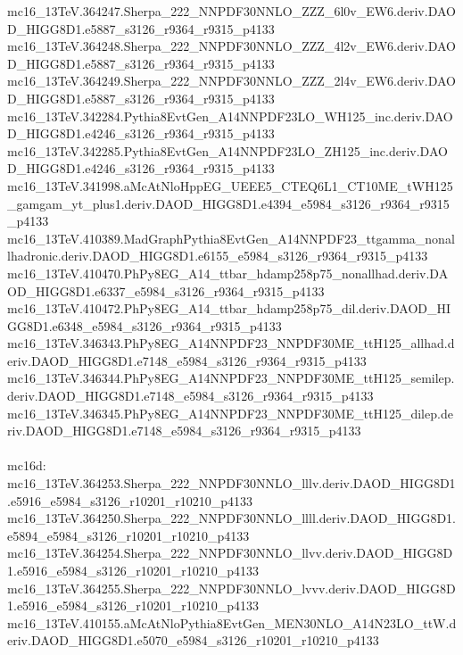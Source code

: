 mc16_13TeV.364247.Sherpa_222_NNPDF30NNLO_ZZZ_6l0v_EW6.deriv.DAOD_HIGG8D1.e5887_s3126_r9364_r9315_p4133 \\
mc16_13TeV.364248.Sherpa_222_NNPDF30NNLO_ZZZ_4l2v_EW6.deriv.DAOD_HIGG8D1.e5887_s3126_r9364_r9315_p4133 \\
mc16_13TeV.364249.Sherpa_222_NNPDF30NNLO_ZZZ_2l4v_EW6.deriv.DAOD_HIGG8D1.e5887_s3126_r9364_r9315_p4133 \\
mc16_13TeV.342284.Pythia8EvtGen_A14NNPDF23LO_WH125_inc.deriv.DAOD_HIGG8D1.e4246_s3126_r9364_r9315_p4133 \\
mc16_13TeV.342285.Pythia8EvtGen_A14NNPDF23LO_ZH125_inc.deriv.DAOD_HIGG8D1.e4246_s3126_r9364_r9315_p4133 \\
mc16_13TeV.341998.aMcAtNloHppEG_UEEE5_CTEQ6L1_CT10ME_tWH125_gamgam_yt_plus1.deriv.DAOD_HIGG8D1.e4394_e5984_s3126_r9364_r9315_p4133 \\
mc16_13TeV.410389.MadGraphPythia8EvtGen_A14NNPDF23_ttgamma_nonallhadronic.deriv.DAOD_HIGG8D1.e6155_e5984_s3126_r9364_r9315_p4133 \\
mc16_13TeV.410470.PhPy8EG_A14_ttbar_hdamp258p75_nonallhad.deriv.DAOD_HIGG8D1.e6337_e5984_s3126_r9364_r9315_p4133 \\
mc16_13TeV.410472.PhPy8EG_A14_ttbar_hdamp258p75_dil.deriv.DAOD_HIGG8D1.e6348_e5984_s3126_r9364_r9315_p4133 \\
mc16_13TeV.346343.PhPy8EG_A14NNPDF23_NNPDF30ME_ttH125_allhad.deriv.DAOD_HIGG8D1.e7148_e5984_s3126_r9364_r9315_p4133 \\
mc16_13TeV.346344.PhPy8EG_A14NNPDF23_NNPDF30ME_ttH125_semilep.deriv.DAOD_HIGG8D1.e7148_e5984_s3126_r9364_r9315_p4133 \\
mc16_13TeV.346345.PhPy8EG_A14NNPDF23_NNPDF30ME_ttH125_dilep.deriv.DAOD_HIGG8D1.e7148_e5984_s3126_r9364_r9315_p4133 \\
 \\
mc16d: \\
mc16_13TeV.364253.Sherpa_222_NNPDF30NNLO_lllv.deriv.DAOD_HIGG8D1.e5916_e5984_s3126_r10201_r10210_p4133 \\
mc16_13TeV.364250.Sherpa_222_NNPDF30NNLO_llll.deriv.DAOD_HIGG8D1.e5894_e5984_s3126_r10201_r10210_p4133 \\
mc16_13TeV.364254.Sherpa_222_NNPDF30NNLO_llvv.deriv.DAOD_HIGG8D1.e5916_e5984_s3126_r10201_r10210_p4133 \\
mc16_13TeV.364255.Sherpa_222_NNPDF30NNLO_lvvv.deriv.DAOD_HIGG8D1.e5916_e5984_s3126_r10201_r10210_p4133 \\
mc16_13TeV.410155.aMcAtNloPythia8EvtGen_MEN30NLO_A14N23LO_ttW.deriv.DAOD_HIGG8D1.e5070_e5984_s3126_r10201_r10210_p4133 \\
